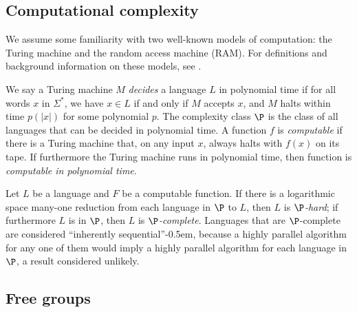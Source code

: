 \documentclass{article}
\begin{document}
\subsection{Computational complexity}

We assume some familiarity with two well-known models of computation: the Turing machine and the random access machine (RAM).
For definitions and background information on these models, see \autocite{savage98}.

We say a Turing machine $M$ \emph{decides} a language $L$ in polynomial time if for all words $x$ in $\Sigma^*$, we have $x \in L$ if and only if $M$ accepts $x$, and $M$ halts within time $p(|x|)$ for some polynomial $p$.
The complexity class $\P$ is the class of all languages that can be decided in polynomial time.
A function $f$ is \emph{computable} if there is a Turing machine that, on any input $x$, always halts with $f(x)$ on its tape.
If furthermore the Turing machine runs in polynomial time, then function is \emph{computable in polynomial time}.

Let $L$ be a language and $F$ be a computable function.
If there is a logarithmic space many-one reduction from each language in $\P$ to $L$, then $L$ is \emph{$\P$-hard}; if furthermore $L$ is in $\P$, then $L$ is \emph{$\P$-complete}.
Languages that are $\P$-complete are considered ``inherently sequential''\kern-0.5em, because a highly parallel algorithm for any one of them would imply a highly parallel algorithm for each language in $\P$, a result considered unlikely.

\subsection{Free groups}
\end{document}
